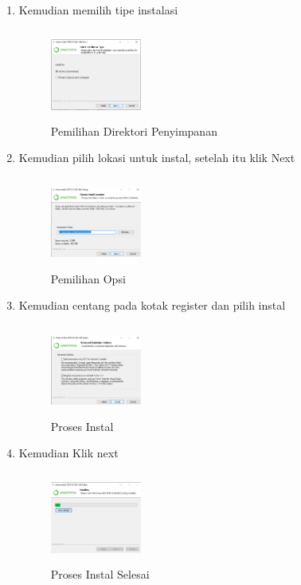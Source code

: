 \begin{enumerate}
    \item Kemudian memilih tipe instalasi
    \begin{figure}[!htbp]
        \centering
        \includegraphics[width=3cm,height=3cm]{figures/g4.png}
        \caption{Pemilihan Direktori Penyimpanan}
        \label{Directory}
        \end{figure}

    \item Kemudian pilih lokasi untuk instal, setelah itu klik Next
    \begin{figure}[!htbp]
        \centering
        \includegraphics[width=3cm,height=3cm]{figures/g5.png}
        \caption{Pemilihan Opsi}
        \label{opsi}
        \end{figure}

    \item Kemudian centang pada kotak register dan pilih instal
    \begin{figure}[!htbp]
        \centering
        \includegraphics[width=3cm,height=3cm]{figures/g6.png}
        \caption{Proses Instal}
        \label{Proses}
        \end{figure}

    \item Kemudian Klik next
    \begin{figure}[!htbp]
        \centering
        \includegraphics[width=3cm,height=3cm]{figures/g7.png}
        \caption{Proses Instal Selesai}
        \label{Proses}
        \end{figure}


\end{enumerate}
